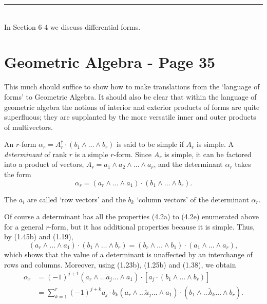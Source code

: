 \documentclass[fleqn]{scrartcl}
\numberwithin{equation}{section}
\begin{document}
\vspace{2em}
\noindent \rule{4cm}{0.4pt} \\
\footnotesize \noindent * In Section 6-4 we discuss differential forms.

\section*{Geometric Algebra - Page 35}

\noindent This much should suffice to show how to make translations from the `language of forms' to Geometric Algebra. It should also be clear that within the language of geometric algebra the notions of interior and exterior products of forms are quite superfluous; they are supplanted by the more versatile inner and outer products of multivectors.

\vspace{1em}
\noindent An \(r\)-form \(\alpha_r = A_r^{\dagger} \cdot (b_1 \wedge \dots \wedge b_r)\) is said to be simple if \(A_r\) is simple. A \textit{determinant} of rank \(r\) is a simple \(r\)-form. Since \(A_r\) is simple, it can be factored into a product of vectors, \(A_r = a_1 \wedge a_2 \wedge \dots \wedge a_r\), and the determinant \(\alpha_r\) takes the form
\begin{equation}
\alpha_r = (a_r \wedge \dots \wedge a_1) \cdot (b_1 \wedge \dots \wedge b_r). \tag{4.8}
\end{equation}

\noindent The \(a_i\) are called `row vectors' and the \(b_k\) `column vectors' of the determinant \(\alpha_r\).

\vspace{1em}
\noindent Of course a determinant has all the properties (4.2a) to (4.2e) enumerated above for a general \(r\)-form, but it has additional properties because it is simple. Thus, by (1.45b) and (1.19),
\begin{equation}
(a_r \wedge \dots \wedge a_1) \cdot (b_1 \wedge \dots \wedge b_r) = (b_r \wedge \dots \wedge b_1) \cdot (a_1 \wedge \dots \wedge a_r), \tag{4.9}
\end{equation}
which shows that the value of a determinant is unaffected by an interchange of rows and columns. Moreover, using (1.23b), (1.25b) and (1.38), we obtain
\begin{equation}
\begin{aligned}
\alpha_r &= (-1)^{j+1} (a_r \wedge \dots \breve{a}_j \dots \wedge a_1) \cdot [a_j \cdot (b_1 \wedge \dots \wedge b_r)] \\
&= \sum_{k=1}^r (-1)^{j+k} a_j \cdot b_k (a_r \wedge \dots \breve{a}_j \dots \wedge a_1) \cdot (b_1 \wedge \dots \breve{b}_k \dots \wedge b_r).
\end{aligned}
\tag{4.10}
\end{equation}
\end{document}
